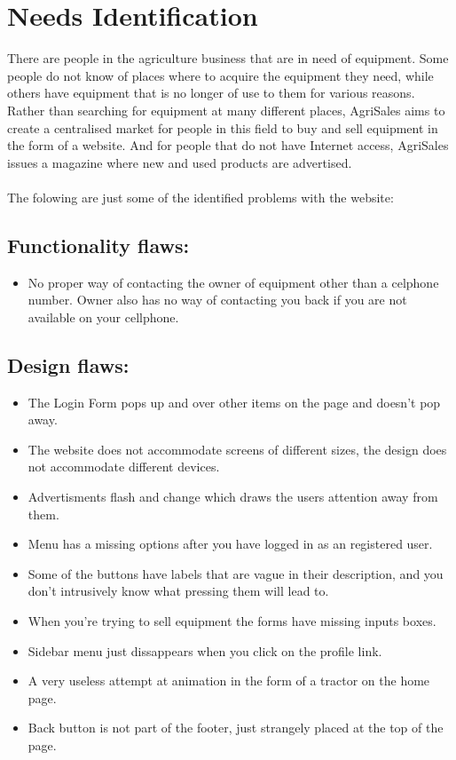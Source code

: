\documentclass[12pt]{article}
\begin{document}


\tableofcontents

\newpage

\section{Needs Identification}

There are people in the agriculture business that are in need of equipment. Some people do not know of places where to acquire the equipment they need, while others have equipment that is no longer of use to them for various reasons. Rather than searching for equipment at many different places, AgriSales aims to create a centralised market for people in this field to buy and sell equipment in the form of a website. And for people that do not have Internet access, AgriSales issues a magazine where new and used products are advertised.
\\ \\
The folowing are just some of the identified problems with the website:

\subsection{Functionality flaws: }

\begin{itemize}
	\item No proper way of contacting the owner of equipment other than a celphone number. Owner also has no way of contacting you back if you are not available on your cellphone.
\end{itemize}

\subsection{Design flaws: }

\begin{itemize}
	\item The Login Form pops up and over other items on the page and doesn’t pop away.
	\item The website does not accommodate screens of different sizes, the design does not accommodate different devices.
	\item Advertisments flash and change which draws the users attention away from them.
	\item Menu has a missing options after you have logged in as an registered user.
	\item Some of the buttons have labels that are vague in their description, and you don’t intrusively know what pressing them will lead to.
	\item When you're trying to sell equipment the forms have missing inputs boxes.
	\item Sidebar menu just dissappears when you click on the profile link.
	\item A very useless attempt at animation in the form of a tractor on the home page.
	\item Back button is not part of the footer, just strangely placed at the top of the page.
\end{itemize}
\end{document}
